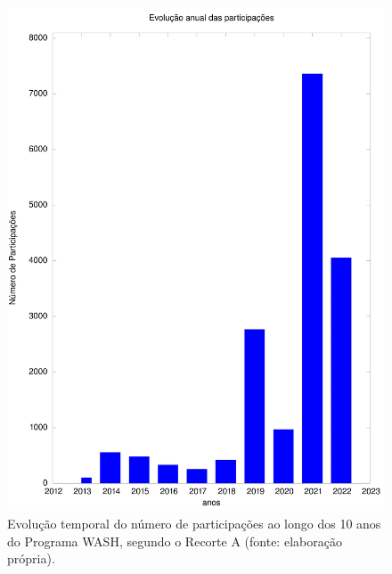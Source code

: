 \captionsetup{format=plain}
\begin{figure}[htb]

\centering


\begin{minipage}[b]{0.4\linewidth}
        \centering
                \includegraphics[width=1.0\linewidth]{../../../imagens/output-participantes.jpeg}
                \caption{Evolução temporal do número de participações ao longo dos 10 anos do Programa WASH, segundo o Recorte A (fonte: elaboração própria).}
                \label{19699bcc5ab8317274249d6743d62534dbfb95fa}
\end{minipage}%
\hspace{0.5cm}
\begin{minipage}[b]{0.4\linewidth}
        \centering

\end{minipage}
\end{figure}
